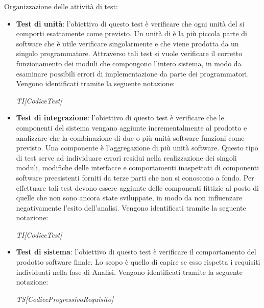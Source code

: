     Organizzazione delle attività di test:
    \begin{itemize}
      \item \textbf{Test di unità}: l'obiettivo di questo test è verificare che ogni unità del  si comporti esattamente come previsto. Un unità di  è la più piccola parte di software che è utile verificare singolarmente e che viene prodotta da un singolo programmatore. Attraverso tali test si vuole verificare il corretto funzionamento dei moduli che compongono l'intero sistema, in modo da esaminare possibili errori di implementazione da parte dei programmatori.
      Vengono identificati tramite la seguente notazione:
\begin{center}
\emph{TI[CodiceTest]}
\end{center}
      

      \item \textbf{Test di integrazione}: l'obiettivo di questo test è verificare che le componenti del sistema vengano aggiunte incrementalmente al prodotto e analizzare che la combinazione di due o più unità software funzioni come previsto. Una componente è l'aggregazione di più unità software.
Questo tipo di test serve ad individuare errori residui nella realizzazione dei singoli moduli, modifiche delle interfacce e comportamenti inaspettati di componenti software preesistenti forniti da terze parti che non si conoscono a fondo.
Per effettuare tali test devono essere aggiunte delle componenti fittizie al posto di quelle che non sono ancora state sviluppate, in modo da non influenzare negativamente l'esito dell'analisi.
Vengono identificati tramite la seguente notazione:
\begin{center}
\emph{TI[CodiceTest]}
\end{center}
      \item \textbf{Test di sistema}: l'obiettivo di questo test è verificare il comportamento del prodotto software finale. Lo scopo è quello di capire se esso rispetta i requisiti individuati nella fase di Analisi.
Vengono identificati tramite la seguente notazione:
\begin{center}
\emph{TS[CodiceProgressivoRequisito]}
\end{center}


\end{itemize}

